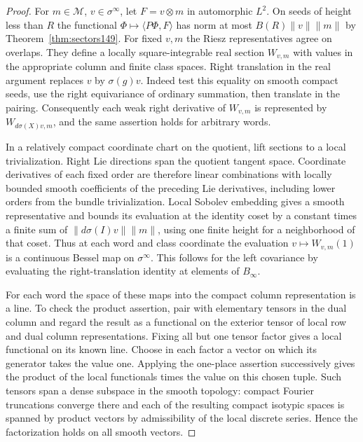 \documentclass[a4paper,11pt]{article}
\theoremstyle{definition}
\theoremstyle{remark}
\numberwithin{equation}{section}
\begin{document}
\begin{proof}
For \(m\in\mathcal M\), \(v\in\sigma^\infty\), let
\(F=v\otimes m\) in automorphic \(L^2\). On seeds of height
less than \(R\) the functional \(\Phi\mapsto\langle P\Phi,F\rangle\)
has norm at most \(B(R)\|v\|\|m\|\) by
Theorem~\ref{thm:sectors149}. For fixed \(v,m\) the Riesz
representatives agree on overlaps. They define a locally
square-integrable real section \(W_{v,m}\) with values in the
appropriate column and finite class spaces. Right translation
in the real argument replaces \(v\) by \(\sigma(g)v\).
Indeed test this equality on smooth compact seeds, use the
right equivariance of ordinary summation, then translate in
the pairing. Consequently each weak right derivative of
\(W_{v,m}\) is represented by \(W_{d\sigma(X)v,m}\), and
the same assertion holds for arbitrary words.

In a relatively compact coordinate chart on the quotient, lift
sections to a local trivialization. Right Lie directions span
the quotient tangent space. Coordinate derivatives of each
fixed order are therefore linear combinations with locally
bounded smooth coefficients of the preceding Lie derivatives,
including lower orders from the bundle trivialization. Local
Sobolev embedding gives a smooth representative and bounds its
evaluation at the identity coset by a constant times a finite
sum of \(\|d\sigma(I)v\|\|m\|\), using one finite height for
a neighborhood of that coset. Thus at each word and class
coordinate the evaluation \(v\mapsto W_{v,m}(1)\) is a
continuous Bessel map on \(\sigma^\infty\). This follows for
the left covariance by evaluating the right-translation
identity at elements of \(B_\infty\).

For each word the space of these maps into the compact column
representation is a line. To check the product assertion, pair
with elementary tensors in the dual column and regard the
result as a functional on the exterior tensor of local row
and dual column representations. Fixing all but one tensor
factor gives a local functional on its known line. Choose in
each factor a vector on which its generator takes the value one.
Applying the one-place assertion successively gives the product
of the local functionals times the value on this chosen tuple.
Such tensors span a dense subspace in the smooth topology:
compact Fourier truncations converge there and each of the
resulting compact isotypic spaces is spanned by product
vectors by admissibility of the local discrete series. Hence
the factorization holds on all smooth vectors.


\end{proof}
\end{document}
